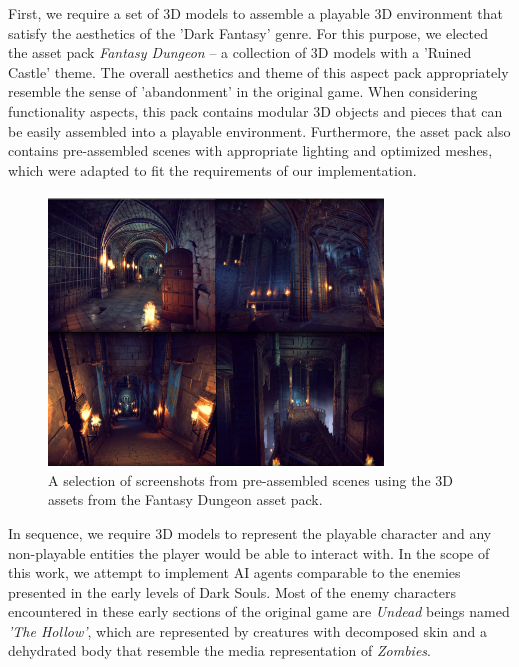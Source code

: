 \documentclass[cic,tc,english]{iiufrgs}
\begin{document}
First, we require a set of 3D models to assemble a playable 3D environment that satisfy the aesthetics of the 'Dark Fantasy' genre. For this purpose, we elected the asset pack \emph{Fantasy Dungeon} -- a collection of 3D models with a 'Ruined Castle' theme. The overall aesthetics and theme of this aspect pack appropriately resemble the sense of 'abandonment' in the original game. When considering functionality aspects, this pack contains modular 3D objects and pieces that can be easily assembled into a playable environment. Furthermore, the asset pack also contains pre-assembled scenes with appropriate lighting and optimized meshes, which were adapted to fit the requirements of our implementation.

\begin{figure}
    \caption{A selection of screenshots from pre-assembled scenes using the 3D assets from the Fantasy Dungeon asset pack.}
    \begin{center}
        \includegraphics[width=24em]{figures/fig-environment-assets.png}
    \end{center}
    \label{fig:environment-assets}
\end{figure}


In sequence, we require 3D models to represent the playable character and any non-playable entities the player would be able to interact with. In the scope of this work, we attempt to implement AI agents comparable to the enemies presented in the early levels of Dark Souls. Most of the enemy characters encountered in these early sections of the original game are \emph{Undead} beings named \emph{'The Hollow'}, which are represented by creatures with decomposed skin and a dehydrated body that resemble the media representation of \emph{Zombies}.
\end{document}
